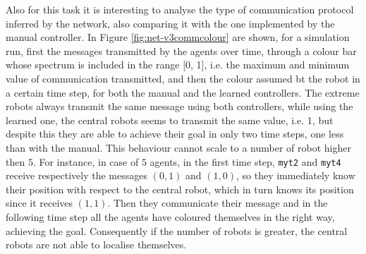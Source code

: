 Also for this task it is interesting to analyse the type of communication protocol 
inferred by the network, also comparing it with the one implemented by the 
manual controller. In Figure \ref{fig:net-v3commcolour} are shown, for a 
simulation run, first the messages transmitted by the agents over time, through a 
colour bar whose spectrum is included in the range [0, 1], i.e. the maximum and 
minimum value of communication transmitted, and then the colour assumed bt 
the robot in a certain time step, for both the manual and the learned controllers.
The extreme robots always transmit the same message using both controllers, 
while using the learned one, the central robots seems to transmit the same value, 
i.e. 1, but despite this they are able to achieve their goal in only two time steps, 
one less than with the manual. This behaviour cannot scale to a number of robot 
higher then $5$. For instance, in case of $5$ agents, in the first time step, 
\texttt{myt2} and \texttt{myt4} receive respectively the messages $(0, 1)$ and $(1, 
0)$, so they immediately know their position with respect to the central robot, 
which in turn knows its position since it receives $(1, 1)$. Then they communicate 
their message and in the following time step all the agents have coloured 
themselves in the right way, achieving the goal.
Consequently if the number of robots is greater, the central robots are not able to 
localise themselves. 
